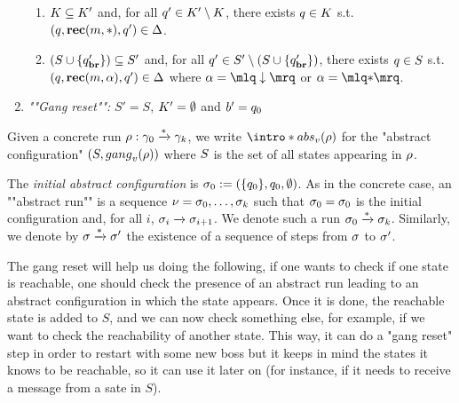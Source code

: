 \begin{definition}
\begin{enumerate}
\begin{enumerate}[i]
		\item\label{item:external_broadcast_clique}$\clique \subseteq \clique'$ and, for all $q' \in \clique' \setminus \clique$, there exists $q \in \clique$ s.t. $(q, \textbf{rec}(m, {*}), q') \in \Delta$.
		
		\item\label{item:external_broadcast_covset}$(S \cup \{q_{\textbf{br}}'\}) \subseteq S'$ and, for all $q' \in S' \setminus (S \cup \{q_{\textbf{br}}'\})$, there exists $q \in S$ s.t. $(q, \textbf{rec}(m, \alpha), q') \in \Delta$ where $\anact = \quotemarks{\enregact}$ or $\anact = \quotemarks{\dummyact}$.
	\end{enumerate}
	\item \emph{""Gang reset"":} $S' = S$, $\clique' = \emptyset$ and $\boss'= q_0$
\end{enumerate}


Given a concrete run $\rho: \gamma_0 \xrightarrow{*} \gamma_k$, we write \AP  $\intro*\absproj{\aval}{\run}$ for the "abstract configuration" $(\covset, \gangof{\aval}{\run})$ where $S$ is the set of all states appearing in $\rho$. 

The \emph{initial abstract configuration} is $\sigma_0 := (\{q_0\}, q_0, \emptyset)$. 
As in the concrete case, an ""abstract run"" is a sequence $\nu = \sigma_0, \dots, \sigma_k$ such that $\sigma_0 = \sigma_0$ is the initial configuration and, for all $i$, $\sigma_i \xrightarrow{} \sigma_{i+1}$. We denote such a run $\sigma_0 \xrightarrow{*} \sigma_k$. Similarly, we denote by $\sigma \xrightarrow{*} \sigma'$ the existence of a sequence of steps from $\sigma$ to $\sigma'$.
\end{definition}

The gang reset will help us doing the following, if one wants to check if one state is reachable, one should check the presence of an abstract run leading to an abstract configuration in which the state appears. Once it is done, the reachable state is added to $S$, and we can  now check something else, for example, if we want to check the reachability of another state. This way, it can do a "gang reset" step in order to restart with some new boss but it keeps in mind the states it knows to be reachable, so it can use it later on (for instance, if it needs to receive a message from a sate in $S$).

